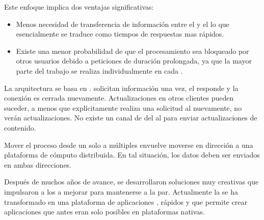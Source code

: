 Este enfoque \clientcentric implica dos ventajas significativas:
\begin{itemize}
	\item Menos necesidad de transferencia de información entre el \serverAS y el \clientAS lo que esencialmente se traduce como tiempos de respuestas mas rápidos.
	\item Existe una menor probabilidad de que el procesamiento sea bloqueado por otros usuarios debido a peticiones de duración prolongada, ya que la mayor parte del trabajo se realiza individualmente en cada \clientAS.
\end{itemize}

La arquitectura \clientserver se basa en \statelessconnectionsINT. \clientsAS solicitan información una vez, el \serverAS responde y la conexión es cerrada nuevamente. Actualizaciones en otros clientes pueden suceder, a menos que explícitamente realiza una solicitud al \serverAS nuevamente, no verán actualizaciones. No existe un canal de \feedback del \serverAS al \clientAS para enviar actualizaciones de contenido.

Mover el proceso desde un solo \serverAS a múltiples \clientsAS envuelve moverse en dirección a una plataforma de cómputo distribuida. En tal situación, los datos deben ser enviados en ambas direcciones.

Después de muchos años de avance, se desarrollaron soluciones muy creativas que impulsaron a los \browsersINT a mejorar para mantenerse a la par. 
Actualmente la \webINT se ha transformado en una plataforma de aplicaciones \fullyfeatured, \runtimesCPT \javaScriptNAME rápidos y \standard \htmlfive que permite crear aplicaciones que antes eran solo posibles en plataformas nativas.

\subsection{\singlePageAppINT}

